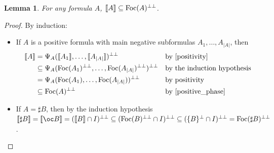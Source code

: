 \documentclass[11pt]{article}
\newtheorem{lemma}[theorem]{Lemma}
\newcommand\0{\textbf{0}}
\newcommand\1{\textbf{1}}
\newcommand\size[1]{{\lvert #1 \rvert}}
\newcommand\sem[1]{{\llbracket #1 \rrbracket}}
\newcommand\biperp{{\perp\perp}}
\newcommand\Foc[1]{\textup{Foc}(#1)}
\begin{document}
\begin{lemma}
    \label{inner_in_foc}
    For any formula $A$, $\sem{A} \subseteq \Foc{A}^\biperp$.
\end{lemma}
\begin{proof}
    By induction:
    \begin{itemize}
        \item If $A$ is a positive formula with main negative subformulas $A_1, \dots, A_\size{A}$, then \begin{align*}
            \sem{A}
            &= \Psi_A(\sem{A_1}, \dots, \sem{A_\size{A}})^\biperp &&\text{by \cref{positivity}} \\
            &\subseteq \Psi_A(\Foc{A_1}^\biperp, \dots, \Foc{A_\size{A}}^\biperp)^\biperp &&\text{by the induction hypothesis} \\
            &= \Psi_A(\Foc{A_1}, \dots, \Foc{A_\size{A}})^\biperp &&\text{by positivity} \\
            &\subseteq \Foc{A}^\biperp &&\text{by \cref{positive_phase}}
        \end{align*}
        \item If $A = \sharp B$, then by the induction hypothesis
        $\sem{\sharp B} = \sem{\oc B} = (\sem{B} \cap I)^\biperp \subseteq (\Foc{B}^\biperp \cap I)^\biperp \subseteq (\{B\}^\perp \cap I)^\biperp = \Foc{\sharp B}^\biperp$.


\end{itemize}
\end{proof}
\end{document}
